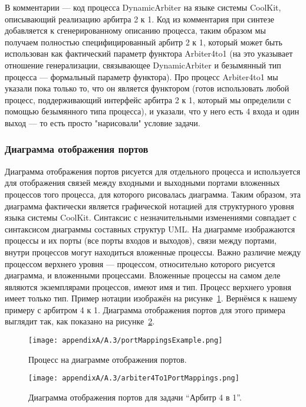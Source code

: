 В комментарии --- код процесса DynamicArbiter на языке системы CoolKit, описывающий 
реализацию арбитра 2 к 1. Код из комментария при синтезе добавляется к сгенерированному 
описанию процесса, таким образом мы получаем полностью специфицированный арбитр 2 к 1, 
который может быть использован как фактический параметр функтора Arbiter4to1 (на это 
указывает отношение генерализации, связывающее DynamicArbiter и безымянный тип процесса --- 
формальный параметр функтора). Про процесс Arbiter4to1 мы указали пока только то, 
что он является функтором (готов использовать любой процесс, поддерживающий интерфейс 
арбитра 2 к 1, который мы определили с помощью безымянного типа процесса), и указали, 
что у него есть 4 входа и один выход --- то есть просто "нарисовали" условие задачи.

\subsubsection{Диаграмма отображения портов}
Диаграмма отображения портов рисуется для отдельного процесса и используется для отображения 
связей между входными и выходными портами вложенных процессов того процесса, для которого 
рисовалась диаграмма. Таким образом, эта диаграмма фактически является графической 
нотацией для структурного уровня языка системы CoolKit. Синтаксис с незначительными 
изменениями совпадает с синтаксисом диаграммы составных структур UML. На диаграмме 
изображаются процессы и их порты (все порты входов и выходов), связи между портами, 
внутри процессов могут находиться вложенные процессы. Важно различие между процессом 
верхнего уровня --- процессом, относительно которого рисуется диаграмма, и вложенными 
процессами. Вложенные процессы на самом деле являются экземплярами процессов, имеют 
имя и тип. Процесс верхнего уровня имеет только тип. Пример нотации изображён на рисунке~\ref{image:portMappingsExample}. 
Вернёмся к нашему примеру с арбитром 4 к 1. Диаграмма отображения портов для этого примера 
выглядит так, как показано на рисунке~\ref{image:arbiter4To1PortMappings}.

\begin{figure} [ht]
	\begin{center}
		\texttt{[image: appendixA/A.3/portMappingsExample.png]}
		\caption{Процесс на диаграмме отображения портов.}
		\label{image:portMappingsExample}
	\end{center}
\end{figure}

\begin{figure} [ht]
	\begin{center}
		\texttt{[image: appendixA/A.3/arbiter4To1PortMappings.png]}
		\caption{Диаграмма отображения портов для задачи "`Арбитр 4 в 1"'.}
		\label{image:arbiter4To1PortMappings}
	\end{center}
\end{figure}

